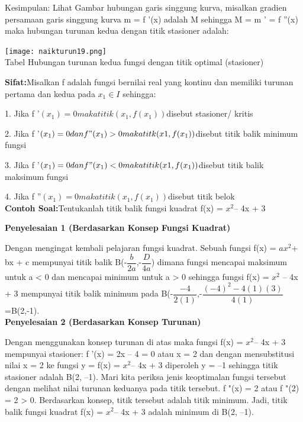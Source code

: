 \documentclass[11pt,fleqn]{book} %
\begin{document}
Kesimpulan: Lihat Gambar hubungan garis singgung kurva, misalkan gradien persamaan garis singgung kurva m = f '(x) adalah M sehingga M = m ' = f ''(x) maka hubungan turunan kedua dengan titik stasioner adalah:

\begin{center}
\texttt{[image: naikturun19.png]}\\
Tabel Hubungan turunan kedua fungsi dengan
titik optimal (stasioner)
\end{center}

\textbf{Sifat:}Misalkan f adalah fungsi bernilai real yang kontinu
dan memiliki turunan pertama dan kedua pada $x_{1} \in I$
sehingga:

1. Jika f '$(x_{1}) = 0 maka titik (x_{1}, f(x_{1}))$disebut stasioner/
kritis

2. Jika f '$(x_{1}) = 0 dan f "(x_{1}) > 0 maka titk (x1, f(x_{1}))$disebut titik balik minimum fungsi

3. Jika f '$(x_{1}) = 0 dan f "(x_{1}) < 0 maka titik (x1, f(x_{1}))$disebut titik balik maksimum fungsi

4. Jika f ''$(x_{1}) = 0 maka titik (x_{1}, f(x_{1})) $disebut titik belok\\

\textbf{Contoh Soal:}Tentukanlah titik balik fungsi kuadrat f(x) = $x^{2} $– 4x + 3

\textbf{Penyelesaian 1 (Berdasarkan Konsep
Fungsi Kuadrat)}

Dengan mengingat kembali pelajaran fungsi kuadrat.
Sebuah fungsi f(x) = $ax^{2} $+ bx + c mempunyai titik balik B(-$\dfrac{b}{2a}$,-$\dfrac{D}{4a}$) dimana fungsi mencapai maksimum untuk a < 0 dan mencapai minimum untuk a > 0 sehingga fungsi
f(x) = $x^{2}$ – 4x + 3 mempunyai titik balik minimum pada B(-$\dfrac{-4}{2(1)}$,-$\dfrac{(-4)^{2}-4(1)(3)}{4(1)}$=B(2,-1).\\

\textbf{Penyelesaian 2 (Berdasarkan Konsep
Turunan)}

Dengan menggunakan konsep turunan di atas maka
fungsi f(x) = $x^{2} $– 4x + 3 mempunyai stasioner: f '(x) = 2x – 4 = 0 atau x = 2 dan dengan mensubstitusi nilai x = 2 ke fungsi y = f(x) = $x^{2} $– 4x + 3 diperoleh y = –1 sehingga titik stasioner adalah B(2, –1). Mari kita periksa jenis keoptimalan fungsi tersebut dengan melihat nilai turunan keduanya pada titik tersebut. f "(x) = 2 atau f "(2) = 2 > 0.
Berdasarkan konsep, titik tersebut adalah titik minimum. Jadi, titik balik fungsi kuadrat f(x) = $x^{2} $– 4x + 3 adalah minimum di B(2, –1).
\end{document}
